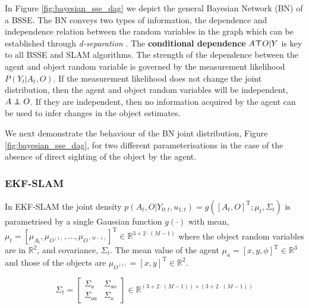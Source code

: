 In Figure \ref{fig:bayesian_sse_dag} we depict the general Bayesian Network (BN) of a BSSE. The BN conveys two types of
information, the dependence and independence relation between the random variables in the graph which can be established
through \textit{d-separation} \cite{BayesBall}. The \textbf{conditional dependence} $A \dependent O | Y$ is key to all BSSE and SLAM algorithms. 
The strength of the dependence between the agent and object random variable is governed by the measurement likelihood $P(Y_t|A_t,O)$. 
If the measurement likelihood does not change the joint distribution, then the agent and object random variables will be independent, $A \independent O$. 
If they are independent, then no information acquired by the agent can be used to infer changes in the object estimates.
    
We next demonstrate the behaviour of the BN joint distribution, Figure \ref{fig:bayesian_sse_dag}, for two different parameterisations 
in the case of the absence of direct sighting of the object by the agent.

\subsubsection{EKF-SLAM}\label{sec:EKF-SLAM}

In EKF-SLAM the joint density $p(A_{t},O|Y_{0:t},u_{1:t}) = g([A_t,O]^{\mathrm{T}};\mu_t,\Sigma_t)$ is parametrised by a single Gaussian 
function $g(\cdot)$ with mean, ${\mu_t = \left[\mu_{A_{t}},\mu_{O^{(1)}},\dots,\mu_{O^{(M-1)}}\right]^{\mathrm{T}}}\in \mathbb{R}^{3 + 2\cdot (M-1)}$  where the 
object random variables are in $\mathbb{R}^2$, and covariance, $\Sigma_t$. The mean value of the agent 
$\mu_a = [x,y,\phi]^{\mathrm{T}} \in \mathbb{R}^3$ and those of the objects are $\mu_{O^{(i)}} = [x,y]^{\mathrm{T}} \in \mathbb{R}^2$.

\begin{equation}
\Sigma_t = \begin{bmatrix}
       \Sigma_a & \Sigma_{ao}  \\[0.3em]
       \Sigma_{oa} & \Sigma_o
     \end{bmatrix}
     \in \mathbb{R}^{(3 + 2\cdot (M-1)) \times (3 + 2\cdot (M-1))}
\end{equation}

